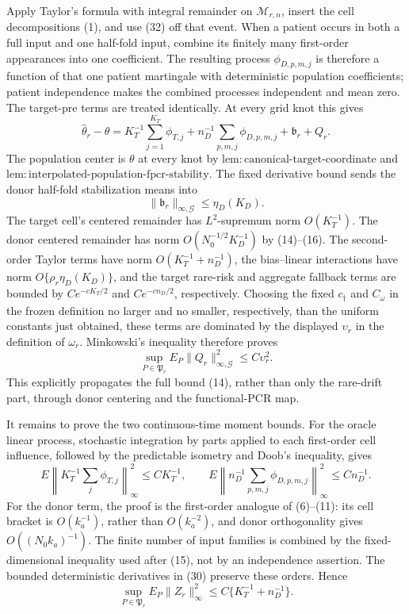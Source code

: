 Apply Taylor's formula with integral remainder on
\(\mathcal M_{r,n}\), insert the cell decompositions (1), and use (32)
off that event.  When a patient occurs in both a full input and one half-fold
input, combine its finitely many first-order appearances into one coefficient.
The resulting process \(\phi_{D,p,m,j}\) is therefore a function of that one
patient martingale with deterministic population coefficients; patient
independence makes the combined processes independent and mean zero.  The
target-pre terms are treated identically.  At every grid knot this gives
\[
 \widehat\theta_r-\theta
 =K_T^{-1}\sum_{j=1}^{K_T}\phi_{T,j}
 +n_D^{-1}\sum_{p,m,j}\phi_{D,p,m,j}
 +\mathfrak b_r+Q_r.                                   \tag{33}
\]
The population center is \(\theta\) at every knot by
\(\mathrm{lem:canonical\mbox{-}target\mbox{-}coordinate}\) and
\(\mathrm{lem:interpolated\mbox{-}population\mbox{-}fpcr\mbox{-}stability}\).
The fixed derivative bound sends the donor half-fold stabilization means into
\[
 \|\mathfrak b_r\|_{\infty,\mathcal G}\leq\eta_D(K_D). \tag{34}
\]
The target cell's centered remainder has \(L^2\)-supremum norm
\(O(K_T^{-1})\).  The donor centered remainder has norm
\(O(N_0^{-1/2}K_D^{-1})\) by (14)--(16).  The second-order Taylor terms have
norm \(O(K_T^{-1}+n_D^{-1})\), the bias--linear interactions have norm
\(O\{\rho_r\eta_D(K_D)\}\), and the target rare-risk and aggregate fallback
terms are bounded by \(Ce^{-cK_T/2}\) and \(Ce^{-cn_D/2}\), respectively.
Choosing the fixed \(c_\dagger\) and \(C_\omega\) in the frozen definition
no larger and no smaller, respectively, than the uniform constants just
obtained, these terms are dominated by the displayed \(\upsilon_r\) in the
definition of \(\omega_r\).  Minkowski's inequality therefore proves
\[
 \sup_{P\in\mathfrak P_r}E_P
 \|Q_r\|_{\infty,\mathcal G}^2\leq C\upsilon_r^2.      \tag{35}
\]
This explicitly propagates the full bound (14), rather than only the
rare-drift part, through donor centering and the functional-PCR map.

It remains to prove the two continuous-time moment bounds.  For the oracle
linear process, stochastic integration by parts applied to each first-order
cell influence, followed by the predictable isometry and Doob's inequality,
gives
\[
 E\left\|K_T^{-1}\sum_j\phi_{T,j}\right\|_\infty^2
 \leq C K_T^{-1},
 \qquad
 E\left\|n_D^{-1}\sum_{p,m,j}\phi_{D,p,m,j}\right\|_\infty^2
 \leq C n_D^{-1}.                                      \tag{36}
\]
For the donor term, the proof is the first-order analogue of (6)--(11): its
cell bracket is \(O(k_a^{-1})\), rather than \(O(k_a^{-2})\), and donor
orthogonality gives \(O((N_0k_a)^{-1})\).  The finite number of input
families is combined by the fixed-dimensional inequality used after (15),
not by an independence assertion.  The bounded deterministic derivatives in
(30) preserve these orders.  Hence
\[
 \sup_{P\in\mathfrak P_r}E_P\|Z_r\|_\infty^2
 \leq C\{K_T^{-1}+n_D^{-1}\}.                          \tag{37}
\]


